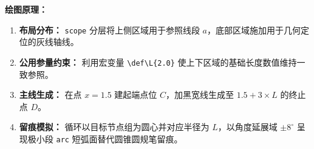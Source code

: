 \vspace{0.5cm}
\textbf{绘图原理：}
\begin{enumerate}
    \item \textbf{布局分布：} \texttt{scope} 分层将上侧区域用于参照线段 $a$，底部区域施加用于几何定位的灰线轴线。
    \item \textbf{公用参量约束：} 利用宏变量 \texttt{\textbackslash def\textbackslash L\{2.0\}} 使上下区域的基础长度数值维持一致参照。
    \item \textbf{主线生成：} 在点 $x=1.5$ 建起端点位 $C$，加黑宽线生成至 $1.5+3\times L$ 的终止点 $D$。
    \item \textbf{留痕模拟：} 循环以目标节点组为圆心并对应半径为 $L$，以角度延展域 $\pm 8^\circ$ 呈现极小段 \texttt{arc} 短弧面替代圆锥圆规笔留痕。
\end{enumerate}

\vspace{1.5cm}
